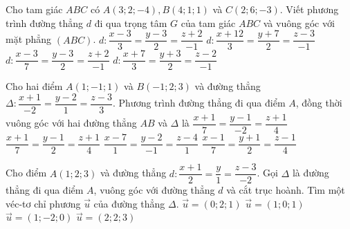 \begin{ex}
	Cho tam giác $ABC$ có $A(3;2;-4), B(4;1;1)$ và $C(2;6;-3).$ Viết phương trình đường thẳng $d$ đi qua trọng tâm $G$ của tam giác $ABC$ và vuông góc với mặt phẳng $(ABC)$.
	\choice
	{$d:\dfrac{x-3}{3}=\dfrac{y-3}{2}=\dfrac{z+2}{-1}$}
	{$d:\dfrac{x+12}{3}=\dfrac{y+7}{2}=\dfrac{z-3}{-1}$}
	{\True $d:\dfrac{x-3}{7}=\dfrac{y-3}{2}=\dfrac{z+2}{-1}$}
	{$d:\dfrac{x+7}{3}=\dfrac{y+3}{2}=\dfrac{z-2}{-1}$}
\end{ex}

\begin{ex}%
	Cho hai điểm $A(1;-1;1)$ và $B(-1;2;3)$ và đường thẳng $\Delta\colon\dfrac{x+1}{-2}=\dfrac{y-2}{1}=\dfrac{z-3}{3}$. Phương trình đường thẳng đi qua điểm $A$, đồng thời vuông góc với hai đường thẳng $AB$ và $\Delta$ là
	\choice
	{$\dfrac{x+1}{7}=\dfrac{y-1}{-2}=\dfrac{z+1}{4}$}
	{$\dfrac{x+1}{7}=\dfrac{y-1}{2}=\dfrac{z+1}{4}$}
	{$\dfrac{x-7}{1}=\dfrac{y-2}{-1}=\dfrac{z-4}{1}$}
	{\True $\dfrac{x-1}{7}=\dfrac{y+1}{2}=\dfrac{z-1}{4}$}
\end{ex}

\begin{ex}
	Cho điểm $A(1;2;3)$ và đường thẳng $d: \dfrac{x+1}{2}=\dfrac{y}{1}=\dfrac{z-3}{-2}$. Gọi $\Delta$ là đường thẳng đi qua điểm $A$, vuông góc với đường thẳng $d$ và cắt trục hoành. Tìm một véc-tơ chỉ phương $\overrightarrow{u}$ của đường thẳng $\Delta$.
	\choice
	{$\overrightarrow{u}=(0;2;1)$}
	{$\overrightarrow{u}=(1;0;1)$}
	{$\overrightarrow{u}=(1;-2;0)$}
	{\True $\overrightarrow{u}=(2;2;3)$}
\end{ex}

